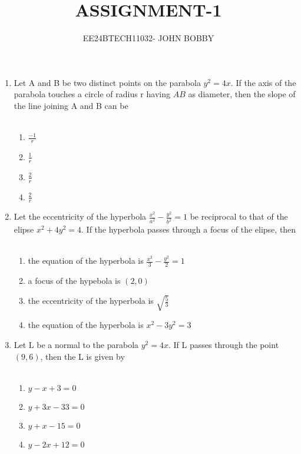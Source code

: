 \documentclass[journal,12pt,twocolumn]{IEEEtran}
\theoremstyle{remark}
\begin{document}

\vspace{3cm}

\title{ASSIGNMENT-1}
\author{EE24BTECH11032- JOHN BOBBY}
\maketitle
\newpage
\bigskip

\begin{enumerate}
	\item Let A and B be two distinct points on the parabola $y^2=4x$. If
the axis of the parabola touches a circle of radius r having
		$AB$ as diameter, then the slope of the line joining A and B
 can be \\
		\hfill{}
		\\
		\begin{enumerate}
			\item$\frac{-1}{r}$
			\item$\frac{1}{r}$
			\item$\frac{2}{r}$
			\item$\frac{2}{r}$
		\end{enumerate}
	\item Let the eccentricity of the hyperbola $\frac{x^2}{a^2}-\frac{y^2}{b^2}=1$ be reciprocal to that of the elipse $x^2+4y^2=4$. If the hyperbola
	passes through a focus of the elipse, then \\
		\hfill{}
		\\
		\begin{enumerate}
			\item the equation of the hyperbola is $\frac{x^2}{3}-\frac{y^2}{2}=1$
			\item a focus of the hypebola is $(2,0)$
			\item the eccentricity of the hyperbola is $\sqrt{\frac{5}{3}}$
			\item the equation of the hyperbola is $x^2-3y^2=3$
		\end{enumerate}
	\item Let L be a normal to the parabola $y^2=4x$. If L passes through the point $(9,6)$, then the L is given by \\
		\hfill{}
		\\
		\begin{enumerate}
			\item $y-x+3=0$
			\item $y+3x-33=0$
			\item $y+x-15=0$
			\item $y-2x+12=0$

\end{enumerate}
\end{enumerate}
\end{document}
